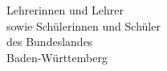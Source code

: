 \documentclass[
	fontsize=12pt,
	parskip=full,
	paper=A4,	
	fromalign=right,
	fromemail=true,
	version=last,
]{scrlttr2}
\begin{document}
\begin{letter}{
	Lehrerinnen und Lehrer\\
	sowie Schülerinnen und Schüler\\
	des Bundeslandes\\
	Baden-Württemberg
}


\end{letter}


\end{document}
